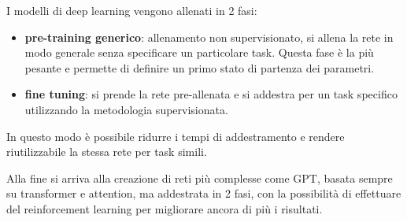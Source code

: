 I modelli di deep learning vengono allenati in 2 fasi:
\begin{itemize}
      \item \textbf{pre-training generico}: allenamento non supervisionato, si
            allena la rete in modo generale senza specificare un particolare
            task. Questa fase è la più pesante e permette di definire un primo
            stato di partenza dei parametri.
      \item \textbf{fine tuning}: si prende la rete pre-allenata e si addestra
            per un task specifico utilizzando la metodologia supervisionata.
\end{itemize}
In questo modo è possibile ridurre i tempi di addestramento e rendere
riutilizzabile la stessa rete per task simili.

Alla fine si arriva alla creazione di reti più complesse come GPT, basata sempre
su transformer e attention, ma addestrata in 2 fasi, con la possibilità di
effettuare del reinforcement learning per migliorare ancora di più i risultati.